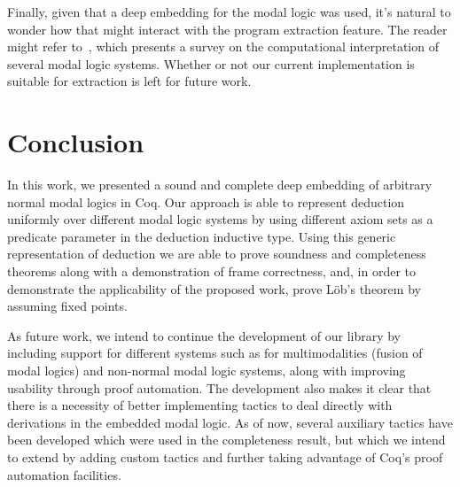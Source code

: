 \documentclass[3p,times]{elsarticle}
\begin{document}
Finally, given that a deep embedding for the modal logic was used, it's
natural to wonder how that might interact with the program extraction feature. The
reader might refer to~\cite{Kavvos16c}, which presents a survey on the computational
interpretation of several modal logic systems. Whether or not our current implementation
is suitable for extraction is left for future work.


\section{Conclusion}\label{sec:conclusion}

In this work, we presented a sound and complete deep embedding of arbitrary
normal modal logics in Coq. Our approach is able to represent deduction
uniformly over different modal logic systems by using different axiom sets
as a predicate parameter in the deduction inductive type. Using this generic
representation of deduction we are able to prove soundness and completeness theorems along with a demonstration of frame correctness, and, in order to demonstrate the applicability of the proposed work, prove L\"ob's theorem
by assuming fixed points. %

As future work, we intend to continue the development of our library by
including support for different systems such as for multimodalities (fusion of modal logics) and
non-normal modal logic systems, along with improving usability through proof automation.
The development also makes it clear that there is a necessity of better implementing tactics to deal directly with derivations in the embedded modal logic. As of now, several auxiliary tactics have been developed which were used in the completeness result, but which we intend to extend by adding custom tactics and further taking advantage of Coq's proof automation facilities.

\end{document}
